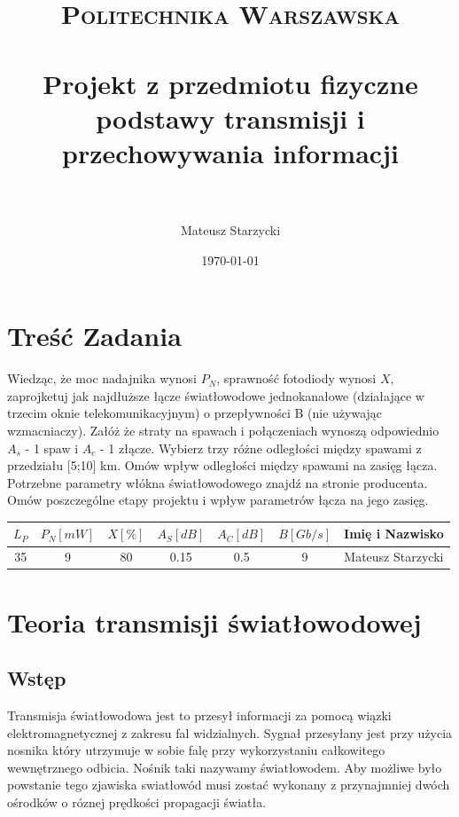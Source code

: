 \documentclass[paper=a4, fontsize=11pt]{scrartcl} %
\title{ 
    \normalfont \normalsize 
    \textsc{Politechnika Warszawska} \\ [25pt] %
    \horrule{0.5pt} \\[0.4cm] %
    \huge Projekt z przedmiotu fizyczne podstawy transmisji i przechowywania informacji \\ %
    \horrule{2pt} \\[0.5cm] %
}
\author{Mateusz Starzycki} %
\date{\normalsize\today} %
\numberwithin{equation}{section} %
\numberwithin{figure}{section} %
\numberwithin{table}{section} %
\begin{document}
\maketitle %
\newpage
\tableofcontents
\newpage

\newpage


\section{Treść Zadania}

Wiedząc, że moc nadajnika wynosi \(P_N\), sprawność fotodiody wynosi \(X\), zaprojketuj jak najdłuższe łącze światłowodowe jednokanałowe
(działające w trzecim oknie telekomunikacyjnym) o przepływności B (nie używając wzmacniaczy). Załóż że straty na spawach i połączeniach wynoszą odpowiednio
\(A_s\) - 1 spaw i \(A_c\) - 1 złącze. Wybierz trzy różne odległości między spawami z przedziału [5;10] km. Omów wpływ odległości między spawami na zasięg łącza.
Potrzebne parametry włókna światłowodowego znajdź na stronie producenta. Omów poszczególne etapy projektu i wpływ parametrów łącza na jego zasięg.

\begin{tabular}{ | c | c | c | c | c | c | c | }
    \hline
    \(L_P\) & \(P_N [mW] \) & \(X[\%]\) & \(A_S[dB]\) & \(A_C[dB]\) & \(B[Gb/s]\) & Imię i Nazwisko \\
    \hline
    35 &  9 & 80 & 0.15 & 0.5 & 9 & Mateusz Starzycki \\
    \hline
\end{tabular}

\section{Teoria transmisji światłowodowej}

\subsection{Wstęp}

Transmisja światłowodowa jest to przesył informacji za pomocą wiązki elektromagnetycznej z zakresu fal widzialnych.
Sygnał przesyłany jest przy użycia nosnika który utrzymuje w sobie falę przy wykorzystaniu całkowitego wewnętrznego odbicia.
Nośnik taki nazywamy światłowodem.
Aby możliwe było powstanie tego zjawiska swiatłowód musi zostać wykonany z przynajmniej dwóch ośrodków o róznej prędkości propagacji światła.
\end{document}
